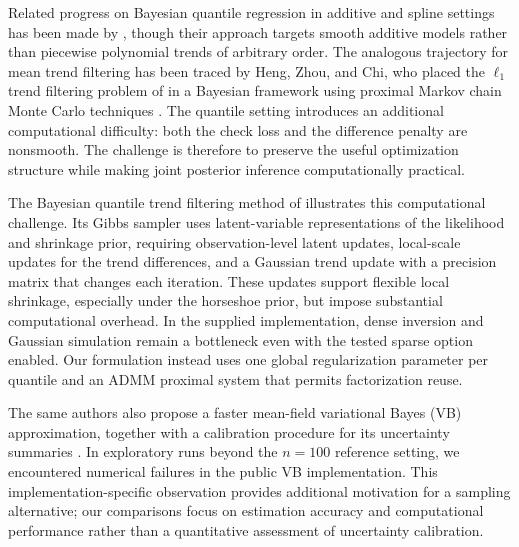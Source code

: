 Related progress on Bayesian quantile regression in additive and spline settings has been made by \citet{fasiolo2021fast}, though their approach targets smooth additive models rather than piecewise polynomial trends of arbitrary order. The analogous trajectory for mean trend filtering has been traced by Heng, Zhou, and Chi, who placed the $\ell_1$ trend filtering problem of \citet{tibshirani2014adaptive} in a Bayesian framework using proximal Markov chain Monte Carlo techniques \citep{pereyra2016proximal}. The quantile setting introduces an additional computational difficulty: both the check loss and the difference penalty are nonsmooth. The challenge is therefore to preserve the useful optimization structure while making joint posterior inference computationally practical.

The Bayesian quantile trend filtering method of \citet{onizuka2024fast} illustrates this computational challenge. Its Gibbs sampler uses latent-variable representations of the likelihood and shrinkage prior, requiring observation-level latent updates, local-scale updates for the trend differences, and a Gaussian trend update with a precision matrix that changes each iteration. These updates support flexible local shrinkage, especially under the horseshoe prior, but impose substantial computational overhead. In the supplied implementation, dense inversion and Gaussian simulation remain a bottleneck even with the tested sparse option enabled. Our formulation instead uses one global regularization parameter per quantile and an ADMM proximal system that permits factorization reuse.

The same authors also propose a faster mean-field variational Bayes (VB) approximation, together with a calibration procedure for its uncertainty summaries \citep{onizuka2024fast}. In exploratory runs beyond the $n=100$ reference setting, we encountered numerical failures in the public VB implementation. This implementation-specific observation provides additional motivation for a sampling alternative; our comparisons focus on estimation accuracy and computational performance rather than a quantitative assessment of uncertainty calibration.

